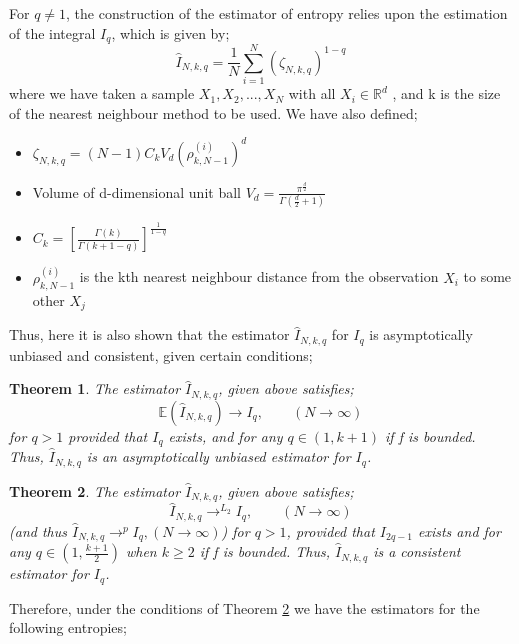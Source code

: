 \documentclass{article}
\newtheorem{theorem}{Theorem}
\begin{document}
For $q \neq 1$, the construction of the estimator of entropy relies upon the estimation of the integral $I_{q}$, which is given by;
\begin{equation}
\hat{I}_{N, k, q} = \frac{1}{N} \sum_{i=1}^{N} (\zeta_{N, k, q})^{1-q}
\end{equation}
where we have taken a sample $X_{1}, X_{2}, ..., X_{N}$ with all $X_{i} \in \mathbb{R}^{d}$ , and k is the size of the nearest neighbour method to be used. We have also defined;
\begin{itemize}
\item $\zeta_{N, k ,q} = (N-1)C_{k}V_{d}(\rho_{k, N-1}^{(i)})^d$
\item Volume of d-dimensional unit ball $V_{d} = \frac{\pi^{\frac{d}{2}}}{\Gamma(\frac{d}{2} + 1 )}$
\item $C_{k} = \left[ \frac{\Gamma(k)}{\Gamma(k+1-q)} \right]^{\frac{1}{1-q}}$
\item $\rho_{k, N-1}^{(i)}$ is the kth nearest neighbour distance from the observation $X_{i}$ to some other $X_{j}$
\end{itemize}

Thus, here it is also shown that the estimator $\hat{I}_{N, k, q}$ for $I_{q}$ is asymptotically unbiased and consistent, given certain conditions;
\begin{theorem} \label{paper2_T1}
The estimator $\hat{I}_{N, k, q}$, given above satisfies;
\begin{equation}
\mathbb{E} (\hat{I}_{N, k, q}) \to I_{q}, \quad \quad (N \to \infty)
\end{equation}
for $q > 1$ provided that $I_{q}$ exists, and for any $q \in (1, k+1)$ if f is bounded.
Thus, $\hat{I}_{N, k, q}$ is an asymptotically unbiased estimator for $I_{q}$.
\end{theorem}

\begin{theorem} \label{paper2_T2}
The estimator $\hat{I}_{N, k, q}$, given above satisfies;
\begin{equation}
\hat{I}_{N, k, q} \to^{L_{2}} I_{q}, \quad \quad (N \to \infty)
\end{equation}
(and thus $\hat{I}_{N, k, q} \to^{p} I_{q},  (N \to \infty)$) for $q>1$, provided that $I_{2q-1}$ exists and for any $q \in (1, \frac{k+1}{2})$ when $ k \geq 2$ if f is bounded.
Thus, $\hat{I}_{N, k, q}$ is a consistent estimator for $I_{q}$.
\end{theorem}

Therefore, under the conditions of Theorem \ref{paper2_T2} we have the estimators for the following entropies;
\end{document}
